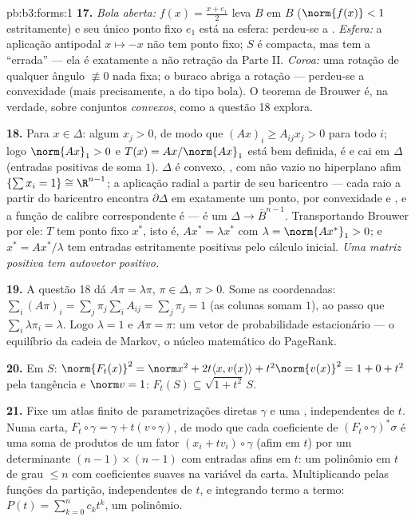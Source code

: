 \begin{solution}{pb:b3:forms:1}
\textbf{17.} \emph{Bola aberta:} $f(x) = \frac{x + e_1}2$ leva
$B$ em $B$ ($\norm{f(x)} < 1$ estritamente) e seu único ponto
fixo $e_1$ está na esfera: perdeu-se a .
\emph{Esfera:} a aplicação antipodal $x \mapsto -x$ não tem
ponto fixo; $S$ é compacta, mas tem a  ``errada''
--- ela é exatamente a não retração da Parte II.
\emph{Coroa:} uma rotação de qualquer ângulo $\not\equiv 0$ nada
fixa; o buraco abriga a rotação --- perdeu-se a convexidade (mais
precisamente, a  do tipo bola). O teorema de Brouwer
é, na verdade, sobre conjuntos \emph{ convexos}, como a questão 18
explora.

\textbf{18.} Para $x \in \Delta$: algum $x_j > 0$, de modo que $(Ax)_i
\geq A_{ij}x_j > 0$ para todo $i$; logo $\norm{Ax}_1 > 0$
e $T(x) = Ax/\norm{Ax}_1$ está bem definida, é  e
cai em $\Delta$ (entradas positivas de soma $1$).
$\Delta$ é convexo, , com  não vazio no
hiperplano afim $\{\sum x_i = 1\} \cong \R^{n-1}$; a
aplicação radial a partir de seu baricentro --- cada raio a partir do
baricentro encontra $\partial\Delta$ em exatamente um ponto, por
convexidade e , e a função de calibre correspondente
é  --- é um  $\Delta \to
\bar B^{n-1}$. Transportando Brouwer por ele: $T$ tem
ponto fixo $x^*$, isto é, $Ax^* = \lambda x^*$ com $\lambda
= \norm{Ax^*}_1 > 0$; e $x^* = Ax^*/\lambda$ tem entradas estritamente
positivas pelo cálculo inicial. \emph{Uma
matriz positiva tem autovetor positivo.}

\textbf{19.} A questão 18 dá $A\pi = \lambda\pi$, $\pi \in
\Delta$, $\pi > 0$. Some as coordenadas: $\sum_i(A\pi)_i =
\sum_j\pi_j\sum_iA_{ij} = \sum_j\pi_j = 1$ (as colunas somam
$1$), ao passo que $\sum_i\lambda\pi_i = \lambda$. Logo $\lambda = 1$
e $A\pi = \pi$: um vetor de probabilidade estacionário --- o
equilíbrio da cadeia de Markov, o núcleo matemático do
PageRank.

\textbf{20.} Em $S$: $\norm{F_t(x)}^2 = \norm x^2 +
2t\langle x, v(x)\rangle + t^2\norm{v(x)}^2 = 1 + 0 + t^2$
pela tangência e $\norm v = 1$: $F_t(S) \subseteq
\sqrt{1+t^2}\,S$.

\textbf{21.} Fixe um atlas finito de parametrizações diretas
$\gamma$ e uma , independentes de $t$. Numa
carta, $F_t\circ\gamma = \gamma + t(v\circ\gamma)$, de modo que cada
coeficiente de $(F_t\circ\gamma)^*\sigma$ é uma soma de
produtos de um fator $(x_i + tv_i)\circ\gamma$ (afim em
$t$) por um determinante $(n-1)\times(n-1)$ com entradas
afins em $t$: um polinômio em $t$ de grau $\leq n$ com
coeficientes suaves na variável da carta. Multiplicando pelas
funções da partição, independentes de $t$, e integrando
termo a termo: $P(t) = \sum_{k=0}^n c_kt^k$, um polinômio.


\end{solution}
